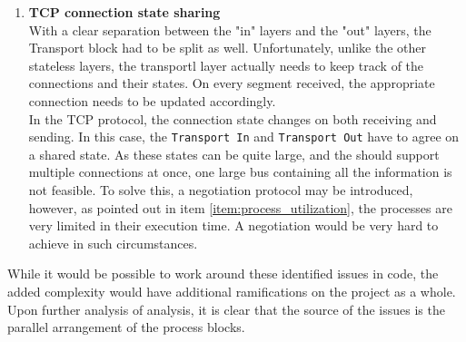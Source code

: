 \begin{enumerate}


\item \textbf{TCP connection state sharing}\\
With a clear separation between the "in" layers and the "out" layers, the 
Transport block had to be split as well. Unfortunately, unlike the other stateless
layers, the transportl layer actually needs to keep track of the connections and 
their states. On every segment received, the appropriate connection needs to be 
updated accordingly.\\
In the TCP protocol, the connection state changes on both receiving and sending.
In this case, the \texttt{Transport In} and \texttt{Transport Out} have to 
agree on a shared state. As these states can be quite large, and the should 
support multiple connections at once, one large bus containing all the information
is not feasible. To solve this, a negotiation protocol may be introduced, however,
as pointed out in item \ref{item:process_utilization}, the processes are very
limited in their execution time. A negotiation would be very hard to achieve in 
such circumstances.

\end{enumerate}

While it would be possible to work around these identified issues in code, the 
added complexity would have additional ramifications on the project as a whole.
Upon further analysis of analysis, it is clear that the source of the issues is 
the parallel arrangement of the process blocks.

